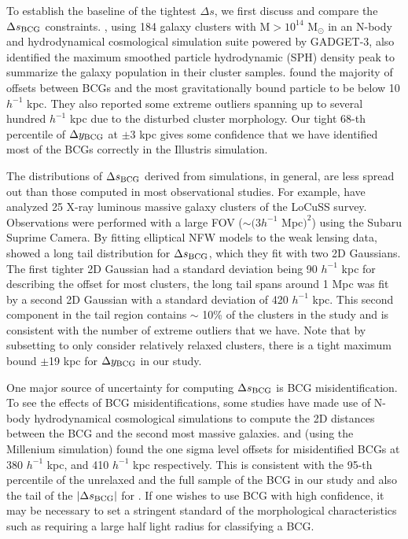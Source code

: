 To establish the baseline of the tightest $\Delta s$, we first discuss and 
compare the $\Delta s_{\rm BCG}$ constraints.   
\cite{Cui2015}, using 184 galaxy clusters with M$ > 10^{14}$ M$_\odot$ in an
N-body and hydrodynamical cosmological simulation suite powered by GADGET-3, 
also identified the maximum smoothed particle hydrodynamic (SPH) density peak
to summarize 
the galaxy population in their cluster samples. \cite{Cui2015} found
the majority of offsets between BCGs and the most gravitationally bound particle to be
below 10 $h^{-1}$ kpc. They also reported some extreme outliers 
spanning up to several hundred $h^{-1}$ kpc due to the disturbed cluster morphology. Our 
tight 68-th percentile of 
$\Delta y_{\rm BCG}$ at $ \pm 3$ kpc gives some confidence that 
we have identified most of the BCGs correctly in the Illustris simulation.

The distributions of $\Delta s_{\rm BCG}$ derived from simulations, in general, 
are less spread out than those computed in most observational studies.
For example, \cite{Oguri2010} have analyzed 25 X-ray luminous 
massive galaxy clusters of the LoCuSS survey. 
Observations were performed with a large FOV ($\sim (3 h^{-1}$ Mpc$)^2$) 
using the Subaru Suprime Camera. 
By fitting elliptical NFW models to the weak lensing data, \cite{Oguri2010}
showed a long tail
 distribution for $\Delta s_{\rm BCG}$, which they fit with two 2D Gaussians.
The first tighter 2D Gaussian had a standard deviation being 90
$h^{-1}$ kpc for describing the
offset for most clusters, the long tail spans around 1 Mpc was fit by a second 2D
Gaussian with a standard deviation of 420 $h^{-1}$ kpc. This second component
in the tail region contains $\sim$ 10\% of the clusters in the study and is
consistent with the number of extreme outliers that we have.   
Note that by subsetting to only consider relatively relaxed clusters, 
there is a tight maximum bound $\pm$19 kpc for $\Delta y_{\rm BCG}$ in our study. 

One major source of uncertainty for computing $\Delta s_{\rm BCG}$ is
BCG misidentification.
To see the effects of BCG misidentifications, 
some studies have made use of N-body hydrodynamical cosmological
simulations to compute the 2D distances between the BCG and 
the second most massive galaxies. \cite{Johnston2007b} and 
\cite{Hilbert2010} (using the Millenium simulation)  found 
the one sigma level offsets for misidentified BCGs at 380 $h^{-1}$ kpc, and 410 
$h^{-1}$ kpc respectively. This is consistent with the 95-th percentile of the
unrelaxed and the full sample of the BCG in our study and also the tail of the
$|\Delta s_{\rm BCG}|$ for \cite{Cui2015}. If one wishes to use BCG with high
confidence, it may be necessary to set a stringent standard of the morphological
characteristics such as requiring a large half light radius for classifying a BCG.

